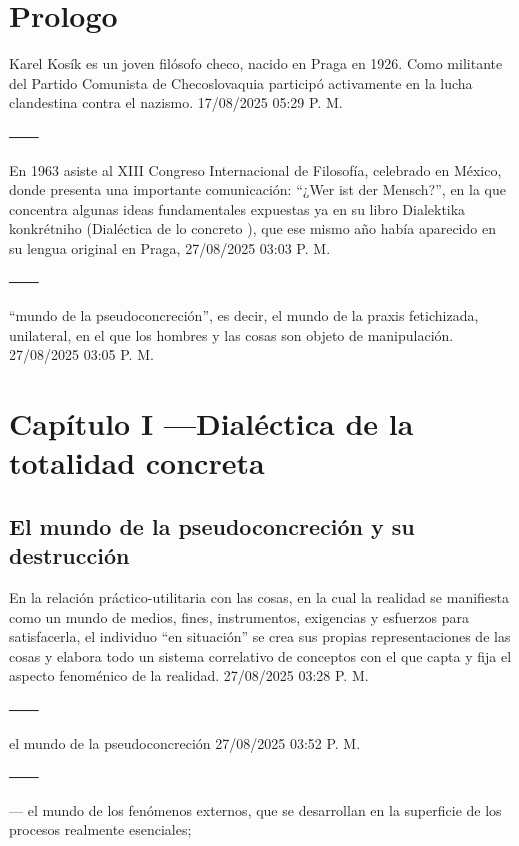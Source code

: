 \documentclass[
  letterpaper,
  DIV=11,
  numbers=noendperiod]{scrreprt}
\begin{document}
\section{Prologo}\label{prologo}

Karel Kosík es un joven filósofo checo, nacido en Praga en 1926. Como
militante del Partido Comunista de Checoslovaquia participó activamente
en la lucha clandestina contra el nazismo. 17/08/2025 05:29 P. M.

───

En 1963 asiste al XIII Congreso Internacional de Filosofía, celebrado en
México, donde presenta una importante comunicación: ``¿Wer ist der
Mensch?'', en la que concentra algunas ideas fundamentales expuestas ya
en su libro Dialektika konkrétniho (Dialéctica de lo concreto ), que ese
mismo año había aparecido en su lengua original en Praga, 27/08/2025
03:03 P. M.

───

``mundo de la pseudoconcreción'', es decir, el mundo de la praxis
fetichizada, unilateral, en el que los hombres y las cosas son objeto de
manipulación. 27/08/2025 03:05 P. M.

\section{Capítulo I ---Dialéctica de la totalidad
concreta}\label{capuxedtulo-i-dialuxe9ctica-de-la-totalidad-concreta}

\subsection{El mundo de la pseudoconcreción y su
destrucción}\label{el-mundo-de-la-pseudoconcreciuxf3n-y-su-destrucciuxf3n-1}

En la relación práctico-utilitaria con las cosas, en la cual la realidad
se manifiesta como un mundo de medios, fines, instrumentos, exigencias y
esfuerzos para satisfacerla, el individuo ``en situación'' se crea sus
propias representaciones de las cosas y elabora todo un sistema
correlativo de conceptos con el que capta y fija el aspecto fenoménico
de la realidad. 27/08/2025 03:28 P. M.

───

el mundo de la pseudoconcreción 27/08/2025 03:52 P. M.

───

--- el mundo de los fenómenos externos, que se desarrollan en la
superficie de los procesos realmente esenciales;
\end{document}
